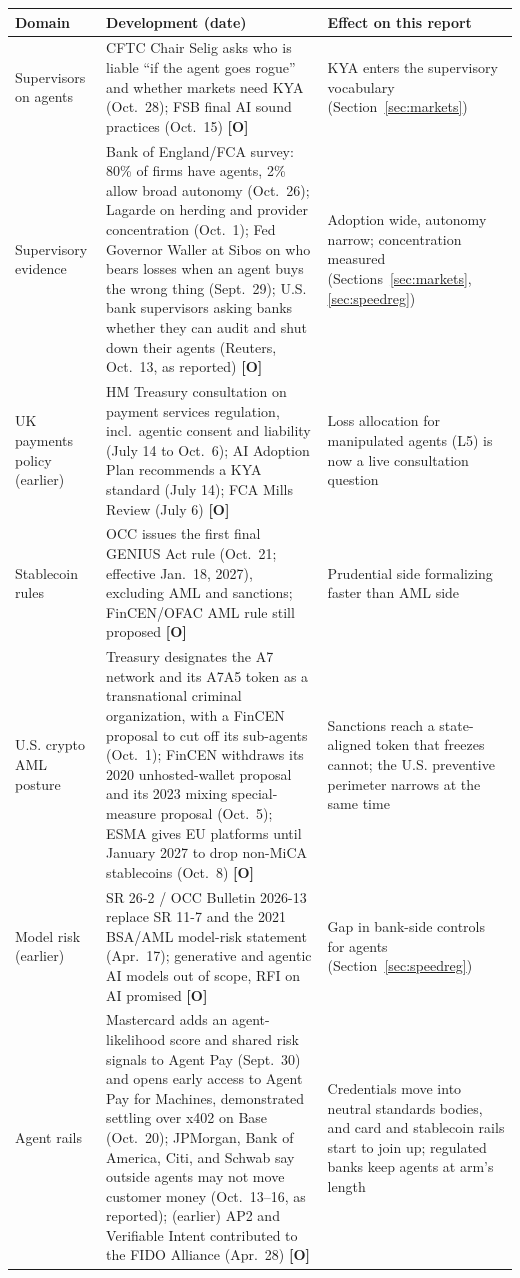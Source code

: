 \documentclass[11pt,letterpaper]{article}
\begin{document}
\begingroup
\small
\begin{longtable}{L{2.5cm}L{7.9cm}L{5.3cm}}
\toprule
\textbf{Domain} & \textbf{Development (date)} & \textbf{Effect on this report} \\
\midrule
\endhead
Supervisors on agents & CFTC Chair Selig asks who is liable ``if the agent goes rogue'' and whether markets need KYA (Oct.\ 28); FSB final AI sound practices (Oct.\ 15) \textbf{[O]} & KYA enters the supervisory vocabulary (Section~\ref{sec:markets}) \\
Supervisory evidence & Bank of England/FCA survey: 80\% of firms have agents, 2\% allow broad autonomy (Oct.\ 26); Lagarde on herding and provider concentration (Oct.\ 1); Fed Governor Waller at Sibos on who bears losses when an agent buys the wrong thing (Sept.\ 29); U.S. bank supervisors asking banks whether they can audit and shut down their agents (Reuters, Oct.\ 13, as reported) \textbf{[O]} & Adoption wide, autonomy narrow; concentration measured (Sections~\ref{sec:markets}, \ref{sec:speedreg}) \\
UK payments policy (earlier) & HM Treasury consultation on payment services regulation, incl.\ agentic consent and liability (July 14 to Oct.\ 6); AI Adoption Plan recommends a KYA standard (July 14); FCA Mills Review (July 6) \textbf{[O]} & Loss allocation for manipulated agents (L5) is now a live consultation question \\
Stablecoin rules & OCC issues the first final GENIUS Act rule (Oct.\ 21; effective Jan.\ 18, 2027), excluding AML and sanctions; FinCEN/OFAC AML rule still proposed \textbf{[O]} & Prudential side formalizing faster than AML side \\
U.S. crypto AML posture & Treasury designates the A7 network and its A7A5 token as a transnational criminal organization, with a FinCEN proposal to cut off its sub-agents (Oct.\ 1); FinCEN withdraws its 2020 unhosted-wallet proposal and its 2023 mixing special-measure proposal (Oct.\ 5); ESMA gives EU platforms until January 2027 to drop non-MiCA stablecoins (Oct.\ 8) \textbf{[O]} & Sanctions reach a state-aligned token that freezes cannot; the U.S. preventive perimeter narrows at the same time \\
Model risk (earlier) & SR 26-2 / OCC Bulletin 2026-13 replace SR 11-7 and the 2021 BSA/AML model-risk statement (Apr.\ 17); generative and agentic AI models out of scope, RFI on AI promised \textbf{[O]} & Gap in bank-side controls for agents (Section~\ref{sec:speedreg}) \\
Agent rails & Mastercard adds an agent-likelihood score and shared risk signals to Agent Pay (Sept.\ 30) and opens early access to Agent Pay for Machines, demonstrated settling over x402 on Base (Oct.\ 20); JPMorgan, Bank of America, Citi, and Schwab say outside agents may not move customer money (Oct.\ 13--16, as reported); (earlier) AP2 and Verifiable Intent contributed to the FIDO Alliance (Apr.\ 28) \textbf{[O]} & Credentials move into neutral standards bodies, and card and stablecoin rails start to join up; regulated banks keep agents at arm's length \\

\end{longtable}
\end{document}
